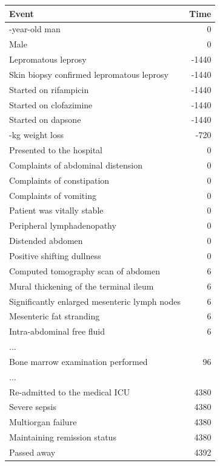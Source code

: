 \begin{ChSixUncaptionedFigure}
\begin{ChSixFloatBody}
\begin{tcolorbox}[
  enhanced,
  colback=gray!4,
  colframe=gray!35,
  boxrule=0.4pt,
  arc=2mm,
  left=3mm,right=3mm,top=2mm,bottom=2mm,
]
\begin{minipage}[t]{0.49\textwidth}
\begin{tcolorbox}[ChSix/annobox,title={GPT-5 annotation}]
\ChSixAnnotationTableStyle
\begin{tabular}{>{\raggedright\arraybackslash}p{} r}
\toprule
\textbf{Event} & \textbf{Time} \\
\midrule
57-year-old man & 0 \\
Male & 0 \\
Lepromatous leprosy & -1440 \\
Skin biopsy confirmed lepromatous leprosy & -1440 \\
Started on rifampicin & -1440 \\
Started on clofazimine & -1440 \\
Started on dapsone & -1440 \\
10-kg weight loss & -720 \\
Presented to the hospital & 0 \\
Complaints of abdominal distension & 0 \\
Complaints of constipation & 0 \\
Complaints of vomiting & 0 \\
Patient was vitally stable & 0 \\
Peripheral lymphadenopathy & 0 \\
Distended abdomen & 0 \\
Positive shifting dullness & 0 \\
Computed tomography scan of abdomen & 6 \\
Mural thickening of the terminal ileum & 6 \\
Significantly enlarged mesenteric lymph nodes & 6 \\
Mesenteric fat stranding & 6 \\
Intra-abdominal free fluid & 6 \\
...\\
Bone marrow examination performed & 96 \\
...\\
Re-admitted to the medical ICU & 4380 \\
Severe sepsis & 4380 \\
Multiorgan failure & 4380 \\
Maintaining remission status & 4380 \\
Passed away & 4392 \\
\bottomrule
\end{tabular}
\end{tcolorbox}
\end{minipage}

\end{tcolorbox}

\end{ChSixFloatBody}
\end{ChSixUncaptionedFigure}